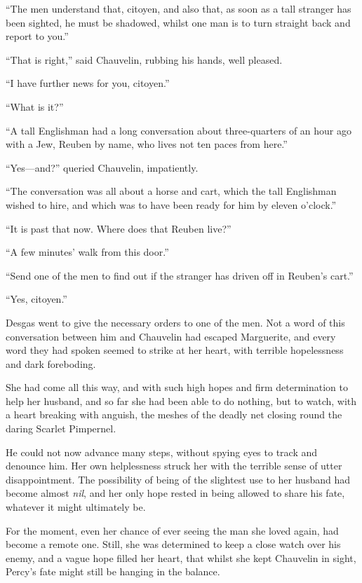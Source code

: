 \documentclass[paper=5.5in:8.5in,BCOR=7mm,twoside,DIV=calc,12pt,usegeometry,chapterprefix,endperiod,headings=big]{scrbook}
\begin{document}
\enquote{The men understand that, citoyen, and also that, as soon as a tall stranger has been sighted, he must be shadowed, whilst one man is to turn straight back and report to you.}

\enquote{That is right,} said Chauvelin, rubbing his hands, well pleased.

\enquote{I have further news for you, citoyen.}

\enquote{What is it?}

\enquote{A tall Englishman had a long conversation about three-quarters of an hour ago with a Jew, Reuben by name, who lives not ten paces from here.}

\enquote{Yes---and?} queried Chauvelin, impatiently.

\enquote{The conversation was all about a horse and cart, which the tall Englishman wished to hire, and which was to have been ready for him by eleven o'clock.}

\enquote{It is past that now. Where does that Reuben live?}

\enquote{A few minutes’ walk from this door.}

\enquote{Send one of the men to find out if the stranger has driven off in Reuben's cart.}

\enquote{Yes, citoyen.}

Desgas went to give the necessary orders to one of the men. Not a word of this conversation between him and Chauvelin had escaped Marguerite, and every word they had spoken seemed to strike at her heart, with terrible hopelessness and dark foreboding.

She had come all this way, and with such high hopes and firm determination to help her husband, and so far she had been able to do nothing, but to watch, with a heart breaking with anguish, the meshes of the deadly net closing round the daring Scarlet Pimpernel.

He could not now advance many steps, without spying eyes to track and denounce him. Her own helplessness struck her with the terrible sense of utter disappointment. The possibility of being of the slightest use to her husband had become almost \textit{nil}, and her only hope rested in being allowed to share his fate, whatever it might ultimately be.

For the moment, even her chance of ever seeing the man she loved again, had become a remote one. Still, she was determined to keep a close watch over his enemy, and a vague hope filled her heart, that whilst she kept Chauvelin in sight, Percy's fate might still be hanging in the balance.
\end{document}
